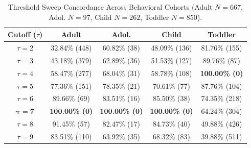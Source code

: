 \begin{table}[h]
\centering
\caption{Threshold Sweep Concordance Across Behavioral Cohorts (Adult $N=667$, Adol. $N=97$, Child $N=262$, Toddler $N=850$).}
\label{tab:threshold_concordance}
\footnotesize
\setlength{\tabcolsep}{3pt}
\begin{tabular}{ccccc}
\toprule
\textbf{Cutoff ($\tau$)} & \textbf{Adult} & \textbf{Adol.} & \textbf{Child} & \textbf{Toddler} \\
\midrule
$\tau = 2$ & 32.84\% (448) & 60.82\% (38) & 48.09\% (136) & 81.76\% (155) \\
$\tau = 3$ & 43.18\% (379) & 62.89\% (36) & 51.53\% (127) & 89.76\% (87) \\
$\tau = 4$ & 58.47\% (277) & 68.04\% (31) & 58.78\% (108) & \textbf{100.00\% (0)} \\
$\tau = 5$ & 77.36\% (151) & 78.35\% (21) & 70.61\% (77) & 87.76\% (104) \\
$\tau = 6$ & 89.66\% (69)  & 83.51\% (16) & 85.50\% (38) & 74.35\% (218) \\
$\boldsymbol{\tau = 7}$ & \textbf{100.00\% (0)} & \textbf{100.00\% (0)} & \textbf{100.00\% (0)} & 64.24\% (304) \\
$\tau = 8$ & 91.45\% (57)  & 82.47\% (17) & 84.73\% (40) & 49.88\% (426) \\
$\tau = 9$ & 83.51\% (110) & 63.92\% (35) & 68.32\% (83) & 39.88\% (511) \\
\bottomrule
\end{tabular}
\end{table}
